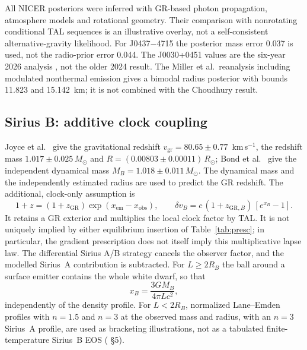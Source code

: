 \documentclass[11pt,a4paper]{article}
\newcommand{\Msun}{M_\odot}
\begin{document}
All NICER posteriors were inferred with GR-based photon propagation, atmosphere models and rotational
geometry. Their comparison with nonrotating conditional TAL sequences is an illustrative overlay, not a
self-consistent alternative-gravity likelihood. For J0437$-$4715 the posterior mass error 0.037 is used,
not the radio-prior error 0.044. The J0030+0451 values are the six-year 2026 analysis \cite{kini}, not the older
2024 result. The Miller et al.\ reanalysis including modulated nonthermal emission \cite{miller} gives a bimodal radius
posterior with bounds 11.823 and 15.142~km; it is not combined with the Choudhury result.

\subsection{Sirius B: additive clock coupling}
Joyce et al.\ \cite{joyce} give the gravitational redshift $v_{\mathrm{gr}}=80.65\pm0.77$~km\,s$^{-1}$, the redshift
mass $1.017\pm0.025\,\Msun$ and $R=(0.00803\pm0.00011)\,R_\odot$; Bond et al.\ \cite{bond} give the independent
dynamical mass $M_B=1.018\pm0.011\,\Msun$. The dynamical mass and the independently estimated radius are used
to predict the GR redshift. The additional, clock-only assumption is
\begin{equation}
1+z=(1+z_{\mathrm{GR}})\exp(x_{\mathrm{em}}-x_{\mathrm{obs}}),\qquad
\delta v_B=c\,(1+z_{\mathrm{GR},B})\,[e^{x_B}-1].
\end{equation}
It retains a GR exterior and multiplies the local clock factor by TAL. It is not uniquely implied by either
equilibrium insertion of Table~\ref{tab:presc}; in particular, the gradient prescription does not itself
imply this multiplicative lapse law. The differential Sirius A/B strategy cancels the observer factor, and the
modelled Sirius~A contribution is subtracted. For $L\ge2R_B$ the ball around a surface emitter contains the
whole white dwarf, so that
\begin{equation}
x_B=\frac{3GM_B}{4\pi Lc^2},
\end{equation}
independently of the density profile. For $L<2R_B$, normalized Lane--Emden profiles with $n=1.5$ and $n=3$
at the observed mass and radius, with an $n=3$ Sirius~A profile, are used as bracketing illustrations, not
as a tabulated finite-temperature Sirius~B EOS ( \S5).
\end{document}

